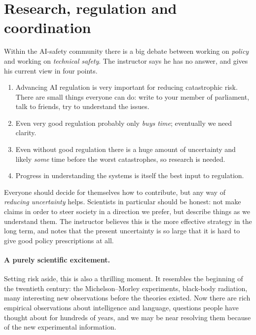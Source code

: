 \section{Research, regulation and coordination}\label{sec:L2-coordination}
Within the AI-safety community there is a big debate between working on \emph{policy} and working on \emph{technical safety}. The instructor says he has no answer, and gives his current view in four points.
\begin{enumerate}
  \item Advancing AI regulation is very important for reducing catastrophic risk. There are small things everyone can do: write to your member of parliament, talk to friends, try to understand the issues.
  \item Even very good regulation probably only \emph{buys time}; eventually we need clarity.
  \item Even without good regulation there is a huge amount of uncertainty and likely \emph{some} time before the worst catastrophes, so research is needed.
  \item Progress in understanding the systems is itself the best input to regulation.
\end{enumerate}
Everyone should decide for themselves how to contribute, but any way of \emph{reducing uncertainty} helps. Scientists in particular should be honest: not make claims in order to steer society in a direction we prefer, but describe things as we understand them. The instructor believes this is the more effective strategy in the long term, and notes that the present uncertainty is so large that it is hard to give good policy prescriptions at all.

\paragraph{A purely scientific excitement.}
Setting risk aside, this is also a thrilling moment. It resembles the beginning of the twentieth century: the Michelson--Morley experiments, black-body radiation, many interesting new observations before the theories existed. Now there are rich empirical observations about intelligence and language,
questions people have thought about for hundreds of years, and we may be near resolving them because of the new experimental information.

